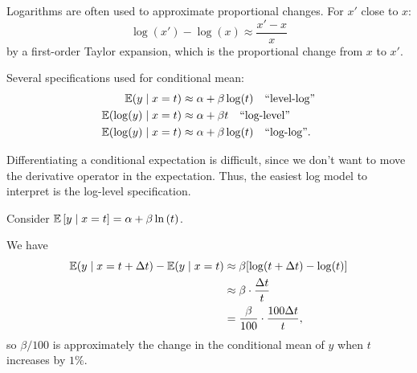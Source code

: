 \begin{remark}[Logarithms]
	Logarithms are often used to approximate proportional changes. For $x'$ close to $x$: \[
		\log(x') - \log(x) \approx \frac{x' - x}{x}
	\] by a first-order Taylor expansion, which is the proportional change from $x$ to $x'$.
	
	Several specifications used for conditional mean: \begin{align*}
		\mathbb{E}(y \mid x = t) &\approx \alpha + \beta \log(t) \quad \text{``level-log''} \\
		\mathbb{E}(\log(y) \mid x = t) &\approx \alpha + \beta t \quad \text{``log-level''} \\
		\mathbb{E}(\log(y) \mid x = t) &\approx \alpha + \beta \log(t) \quad \text{``log-log''}
	.\end{align*}
\end{remark}

Differentiating a conditional expectation is difficult, since we don't want to move the derivative operator in the expectation. Thus, the easiest log model to interpret is the log-level specification.

\begin{remark}
	Consider $\mathbb{E}\left[y \mid x = t\right] = \alpha + \beta \ln{\left(t\right)}$.

	We have \begin{align*}
		\mathbb{E}(y \mid x = t + \Delta t) - \mathbb{E}(y \mid x = t) &\approx \beta[\log(t + \Delta t) - \log(t)] \\
		&\approx \beta \cdot \frac{\Delta t}{t} \\
		&= \frac{\beta}{100} \cdot \frac{100\Delta t}{t}
	,\end{align*} so $\beta/100$ is approximately the change in the conditional mean of $y$ when $t$ increases by $1\%$.
\end{remark}

